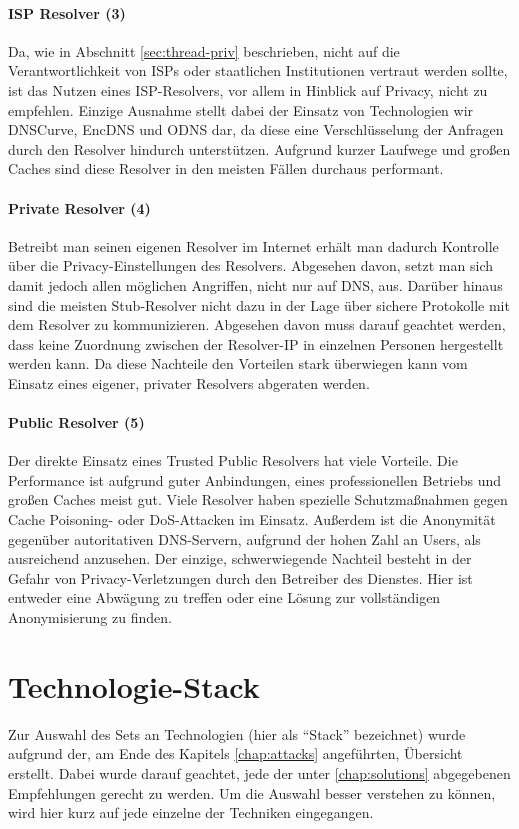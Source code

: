 \paragraph{ISP Resolver (3)}
Da, wie in Abschnitt \ref{sec:thread-priv} beschrieben, nicht auf die Verantwortlichkeit von ISPs oder staatlichen Institutionen vertraut werden sollte, ist das Nutzen eines ISP-Resolvers, vor allem in Hinblick auf Privacy, nicht zu empfehlen. Einzige Ausnahme stellt dabei der Einsatz von Technologien wir DNSCurve, EncDNS und ODNS dar, da diese eine Verschlüsselung der Anfragen durch den Resolver hindurch unterstützen. Aufgrund kurzer Laufwege und großen Caches sind diese Resolver in den meisten Fällen durchaus performant.

\paragraph{Private Resolver (4)}
Betreibt man seinen eigenen Resolver im Internet erhält man dadurch Kontrolle über die Privacy-Einstellungen des Resolvers. Abgesehen davon, setzt man sich damit jedoch allen möglichen Angriffen, nicht nur auf DNS, aus. Darüber hinaus sind die meisten Stub-Resolver nicht dazu in der Lage über sichere Protokolle mit dem Resolver zu kommunizieren. Abgesehen davon muss darauf geachtet werden, dass keine Zuordnung zwischen der Resolver-IP in einzelnen Personen hergestellt werden kann. Da diese Nachteile den Vorteilen stark überwiegen kann vom Einsatz eines eigener, privater Resolvers abgeraten werden.

\paragraph{Public Resolver (5)}
Der direkte Einsatz eines Trusted Public Resolvers hat viele Vorteile. Die Performance ist aufgrund guter Anbindungen, eines professionellen Betriebs und großen Caches meist gut. Viele Resolver haben spezielle Schutzmaßnahmen gegen Cache Poisoning- oder DoS-Attacken im Einsatz. Außerdem ist die Anonymität gegenüber autoritativen DNS-Servern, aufgrund der hohen Zahl an Users, als ausreichend anzusehen. Der einzige, schwerwiegende Nachteil besteht in der Gefahr von Privacy-Verletzungen durch den Betreiber des Dienstes. Hier ist entweder eine Abwägung zu treffen oder eine Lösung zur vollständigen Anonymisierung zu finden. 

\section{Technologie-Stack}
Zur Auswahl des Sets an Technologien (hier als ``Stack'' bezeichnet) wurde aufgrund der, am Ende des Kapitels \ref{chap:attacks} angeführten, Übersicht erstellt. Dabei wurde darauf geachtet, jede der unter \ref{chap:solutions} abgegebenen Empfehlungen gerecht zu werden. Um die Auswahl besser verstehen zu können, wird hier kurz auf jede einzelne der Techniken eingegangen.


